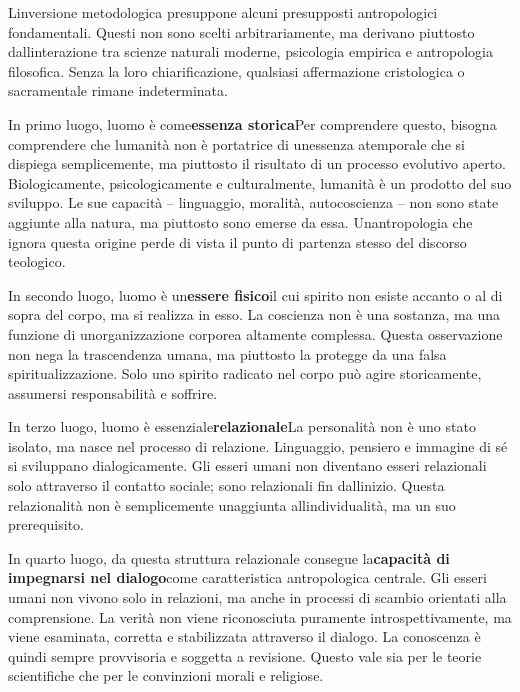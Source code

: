 \documentclass[
]{article}
\begin{document}
L\textquotesingle inversione metodologica presuppone alcuni presupposti antropologici fondamentali. Questi non sono scelti arbitrariamente, ma derivano piuttosto dall\textquotesingle interazione tra scienze naturali moderne, psicologia empirica e antropologia filosofica. Senza la loro chiarificazione, qualsiasi affermazione cristologica o sacramentale rimane indeterminata.

In primo luogo, l\textquotesingle uomo è come\textbf{essenza storica}Per comprendere questo, bisogna comprendere che l\textquotesingle umanità non è portatrice di un\textquotesingle essenza atemporale che si dispiega semplicemente, ma piuttosto il risultato di un processo evolutivo aperto. Biologicamente, psicologicamente e culturalmente, l\textquotesingle umanità è un prodotto del suo sviluppo. Le sue capacità -- linguaggio, moralità, autocoscienza -- non sono state aggiunte alla natura, ma piuttosto sono emerse da essa. Un\textquotesingle antropologia che ignora questa origine perde di vista il punto di partenza stesso del discorso teologico.

In secondo luogo, l\textquotesingle uomo è un\textbf{essere fisico}il cui spirito non esiste accanto o al di sopra del corpo, ma si realizza in esso. La coscienza non è una sostanza, ma una funzione di un\textquotesingle organizzazione corporea altamente complessa. Questa osservazione non nega la trascendenza umana, ma piuttosto la protegge da una falsa spiritualizzazione. Solo uno spirito radicato nel corpo può agire storicamente, assumersi responsabilità e soffrire.

In terzo luogo, l\textquotesingle uomo è essenziale\textbf{relazionale}La personalità non è uno stato isolato, ma nasce nel processo di relazione. Linguaggio, pensiero e immagine di sé si sviluppano dialogicamente. Gli esseri umani non diventano esseri relazionali solo attraverso il contatto sociale; sono relazionali fin dall\textquotesingle inizio. Questa relazionalità non è semplicemente un\textquotesingle aggiunta all\textquotesingle individualità, ma un suo prerequisito.

In quarto luogo, da questa struttura relazionale consegue la\textbf{capacità di impegnarsi nel dialogo}come caratteristica antropologica centrale. Gli esseri umani non vivono solo in relazioni, ma anche in processi di scambio orientati alla comprensione. La verità non viene riconosciuta puramente introspettivamente, ma viene esaminata, corretta e stabilizzata attraverso il dialogo. La conoscenza è quindi sempre provvisoria e soggetta a revisione. Questo vale sia per le teorie scientifiche che per le convinzioni morali e religiose.
\end{document}
